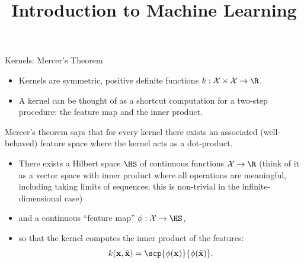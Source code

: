 \documentclass[11pt,compress,t,notes=noshow, xcolor=table]{beamer}
\title{Introduction to Machine Learning}
\begin{document}

\begin{vbframe}{Kernels: Mercer's Theorem}
  \begin{itemize}
    \item Kernels are symmetric, positive definite functions
      $k : \Xspace \times \Xspace \to \R$.
   \item A kernel can be thought of as a shortcut computation for a two-step procedure: the feature map and the inner product.
  \end{itemize}

  \lz

  Mercer's theorem says that for every kernel there exists an 
  associated (well-behaved) feature space where the kernel acts as a dot-product.
 

  \lz

  \begin{itemize}
    \item There exists a Hilbert space $\HS$ of continuous
    functions $\Xspace \to \R$
    {\small (think of it as a vector space with inner product
    where all operations are meaningful, including taking limits of
    sequences; this is non-trivial in the infinite-dimensional
    case)}
    \item and a continuous ``feature map'' $\phi : \Xspace \to \HS$,
    \item so that the kernel computes the inner product of the features:
    $$ k(\xv, \tilde \xv) = \scp{\phi(\xv)}{\phi(\tilde \xv)}.$$
  \end{itemize}

\end{vbframe}
\end{document}
